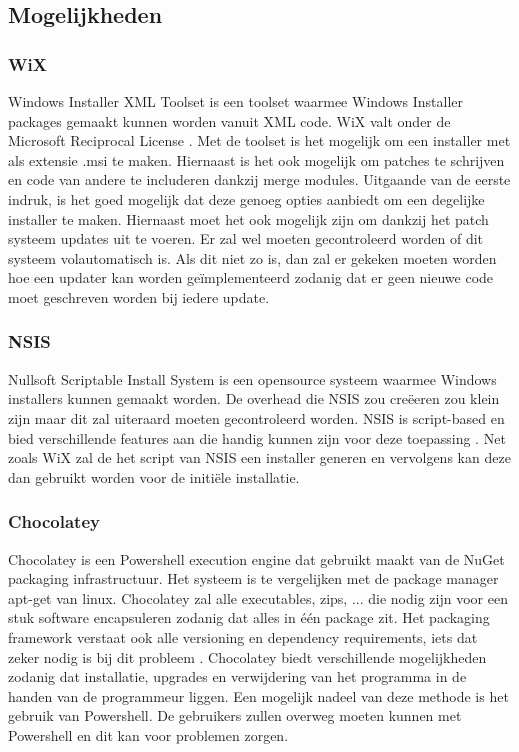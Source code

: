 \documentclass{article}
\begin{document}
\subsection{Mogelijkheden}\label{section:mogelijkheden}
\subsubsection{WiX \citep{wixMain}}
Windows Installer XML Toolset is een toolset waarmee Windows Installer packages gemaakt kunnen worden vanuit XML code.
WiX valt onder de Microsoft Reciprocal License \citep{wixLicense}.
Met de toolset is het mogelijk om een installer met als extensie .msi te maken.
Hiernaast is het ook mogelijk om patches te schrijven en code van andere te includeren dankzij merge modules\citep{wixMergers}.
Uitgaande van de eerste indruk, is het goed mogelijk dat deze genoeg opties aanbiedt om een degelijke installer te maken.
Hiernaast moet het ook mogelijk zijn om dankzij het patch systeem updates uit te voeren.
Er zal wel moeten gecontroleerd worden of dit systeem volautomatisch is.
Als dit niet zo is, dan zal er gekeken moeten worden hoe een updater kan worden ge\"implementeerd zodanig dat er geen nieuwe code moet geschreven worden bij iedere update.

\subsubsection{NSIS \citep{nsisMain}}
Nullsoft Scriptable Install System is een opensource systeem waarmee Windows installers kunnen gemaakt worden.
De overhead die NSIS zou cre\"eeren zou klein zijn maar dit zal uiteraard moeten gecontroleerd worden. 
NSIS is script-based en bied verschillende features aan die handig kunnen zijn voor deze toepassing \citep{nsisFeatures}.
Net zoals WiX zal de het script van NSIS een installer generen en vervolgens kan deze dan gebruikt worden voor de initi\"ele installatie.

\subsubsection{Chocolatey \citep{chocoMain}}
Chocolatey is een Powershell execution engine dat gebruikt maakt van de NuGet packaging infrastructuur.
Het systeem is te vergelijken met de package manager apt-get van linux.
Chocolatey zal alle executables, zips, ... die nodig zijn voor een stuk software encapsuleren zodanig dat alles in \'e\'en package zit.
Het packaging framework verstaat ook alle versioning en dependency requirements, iets dat zeker nodig is bij dit probleem \citep{chocoDoc}.
Chocolatey biedt verschillende mogelijkheden zodanig dat installatie, upgrades en verwijdering van het programma in de handen van de programmeur liggen.
Een mogelijk nadeel van deze methode is het gebruik van Powershell. 
De gebruikers zullen overweg moeten kunnen met Powershell en dit kan voor problemen zorgen. 
\end{document}

